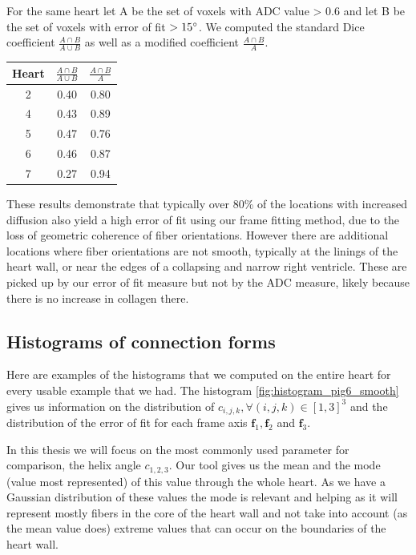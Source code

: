 For the same heart let A be the set of voxels with ADC value > 0.6 and let B be the set of voxels with error of fit $> 15 ^{\circ}$. We computed the standard Dice coefficient $\frac{A \cap B}{A \cup B}$ as well as a modified coefficient $\frac{A \cap B}{A}$.
\begin{center}
    \begin{tabular}{|c | c | c |}
         \hline
         Heart & $\frac{A \cap B}{A \cup B}$ & $\frac{A \cap B}{A}$ \\
         \hline
         2 & 0.40 & 0.80 \\ 
         \hline
         4 & 0.43 & 0.89 \\
         \hline
         5 & 0.47 & 0.76 \\
         \hline
         6 & 0.46 & 0.87 \\
         \hline
         7 & 0.27 & 0.94 \\ 
         \hline
    \end{tabular}
\end{center}

These results demonstrate that typically over 80\% of the locations with increased diffusion also yield a high error of fit using our frame fitting method, due to the loss of geometric coherence of fiber orientations. However there are additional locations where fiber orientations are not smooth, typically at the linings of the heart wall, or near the edges of a collapsing and narrow right ventricle. These are picked up by our error of fit measure but not by the ADC measure, likely because there is no increase in collagen there.

\subsection{Histograms of connection forms} \label{histogram_section}

Here are examples of the histograms that we computed on the entire heart for every usable example that we had. The histogram \ref{fig:histogram_pig6_smooth} gives us information on the distribution of $c_{i,j,k}, \forall (i, j, k) \in [1, 3]^3$ and the distribution of the error of fit for each frame axis $\mathbf{f}_1, \mathbf{f}_2$ and $\mathbf{f}_3$.

In this thesis we will focus on the most commonly used parameter for comparison, the helix angle $c_{1,2,3}$. Our tool gives us the mean and the mode (value most represented) of this value through the whole heart. As we have a Gaussian distribution of these values the mode is relevant and helping as it will represent mostly fibers in the core of the heart wall and not take into account (as the mean value does) extreme values that can occur on the boundaries of the heart wall.

